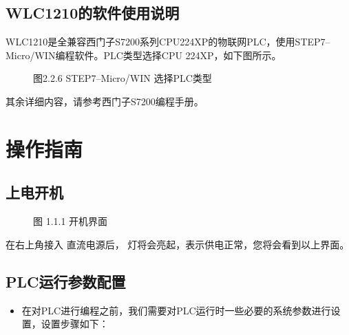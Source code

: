 \documentclass[a4paper,10pt,english]{sphinxmanual}
\begin{document}
\section{WLC\sphinxhyphen{}1210的软件使用说明}
\label{\detokenize{Product_Overview:id3}}
\sphinxAtStartPar
WLC\sphinxhyphen{}1210是全兼容西门子S7\sphinxhyphen{}200系列CPU224XP的物联网PLC，使用STEP7–Micro/WIN编程软件。PLC类型选择CPU 224XP，如下图所示。

\begin{figure}[htbp]
\centering
\capstart

\noindent{}
\caption{图2.2.6  STEP7–Micro/WIN 选择PLC类型}\label{\detokenize{Product_Overview:id17}}\end{figure}

\sphinxAtStartPar
其余详细内容，请参考西门子S7\sphinxhyphen{}200编程手册。


\chapter{操作指南}
\label{\detokenize{operation_guide:id1}}\label{\detokenize{operation_guide::doc}}

\section{上电开机}
\label{\detokenize{operation_guide:id2}}
\begin{figure}[htbp]
\centering
\capstart

\noindent{}
\caption{图 1.1.1 开机界面}\label{\detokenize{operation_guide:id5}}\end{figure}

\sphinxAtStartPar
在右上角接入  直流电源后， 灯将会亮起，表示供电正常，您将会看到以上界面。


\section{PLC运行参数配置}
\label{\detokenize{operation_guide:plc}}\begin{itemize}
\item {} 
\sphinxAtStartPar
在对PLC进行编程之前，我们需要对PLC运行时一些必要的系统参数进行设置，设置步骤如下：

\end{itemize}
\end{document}
